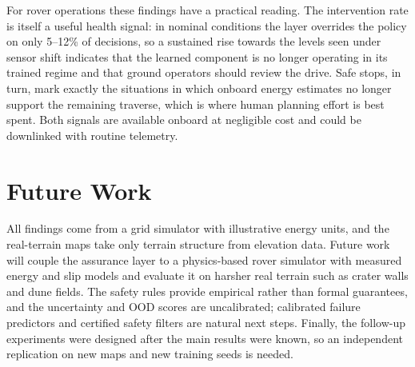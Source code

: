 \documentclass[conference]{IEEEtran}
\begin{document}
For rover operations these findings have a practical reading. The intervention rate is itself a useful health signal:
in nominal conditions the layer overrides the policy on only 5--12\% of decisions, so a sustained rise towards the levels
seen under sensor shift indicates that the learned component is no longer operating in its trained regime and that ground
operators should review the drive. Safe stops, in turn, mark exactly the situations in which onboard energy estimates no
longer support the remaining traverse, which is where human planning effort is best spent. Both signals are available
onboard at negligible cost and could be downlinked with routine telemetry. 

\section{Future Work}
All findings come from a grid simulator with illustrative energy units, and the real-terrain maps take only terrain
structure from elevation data. Future work will couple the assurance layer to a physics-based rover simulator with
measured energy and slip models and evaluate it on harsher real terrain such as crater walls and dune fields. The safety
rules provide empirical rather than formal guarantees, and the uncertainty and OOD scores are uncalibrated; calibrated
failure predictors and certified safety filters are natural next steps. Finally, the follow-up experiments were designed
after the main results were known, so an independent replication on new maps and new training seeds is needed.

\end{document}
